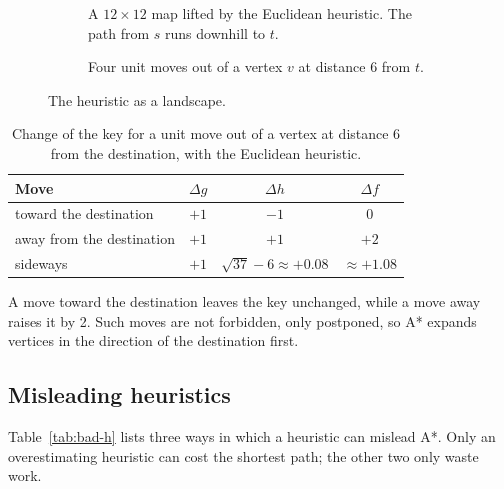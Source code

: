 \begin{figure}[htbp]
  \centering
  \begin{subfigure}[b]{0.50\textwidth}\centering
    
    \caption{A $12 \times 12$ map lifted by the Euclidean heuristic. The path
      from $s$ runs downhill to $t$.}\label{fig:landscape-a}
  \end{subfigure}\hfill
  \begin{subfigure}[b]{0.46\textwidth}\centering
    
    \caption{Four unit moves out of a vertex $v$ at distance 6 from
      $t$.}\label{fig:landscape-b}
  \end{subfigure}
  \caption{The heuristic as a landscape.}\label{fig:landscape}
\end{figure}

\begin{table}[htbp]
  \centering
  \caption{Change of the key for a unit move out of a vertex at distance 6 from
    the destination, with the Euclidean heuristic.}\label{tab:slope}
  \begin{tabular}{@{}lccc@{}}
    \toprule
    Move & $\Delta g$ & $\Delta h$ & $\Delta f$\\
    \midrule
    toward the destination    & $+1$ & $-1$ & \textcolor{algastar}{$0$}\\
    away from the destination & $+1$ & $+1$ & \textcolor{cbRed}{$+2$}\\
    sideways           & $+1$ & $\sqrt{37} - 6 \approx +0.08$ & $\approx +1.08$\\
    \bottomrule
  \end{tabular}
\end{table}

A move toward the destination leaves the key unchanged, while a move away raises
it by 2. Such moves are not forbidden, only postponed, so A* expands vertices in
the direction of the destination first.

\subsection{Misleading heuristics}\label{sec:bad-h}

Table~\ref{tab:bad-h} lists three ways in which a heuristic can mislead A*.
Only an overestimating heuristic can cost the shortest path; the other two only
waste work.

